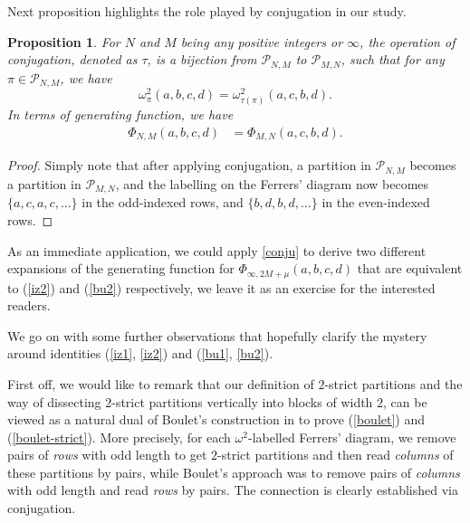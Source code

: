 \documentclass[12pt]{amsart}
\numberwithin{equation}{section}
\theoremstyle{plain}
\newtheorem{proposition}[theorem]{Proposition}
\theoremstyle{definition}
\begin{document}
Next proposition highlights the role played by conjugation in our study.
\begin{proposition}
For $N$ and $M$ being any positive integers or $\infty$, the operation of conjugation, denoted as $\tau$, is a bijection from $\mathcal{P}_{N,M}$ to $\mathcal{P}_{M,N}$, such that for any $\pi\in\mathcal{P}_{N,M}$, we have 
$$\omega^2_{\pi}(a,b,c,d)=\omega^2_{\tau(\pi)}(a,c,b,d).
$$
 In terms of generating function, we have
\begin{align}\label{conju}
\Phi_{N,M}(a,b,c,d) &=\Phi_{M,N}(a,c, b,d).
\end{align}
\end{proposition}
\begin{proof}
Simply note that after applying conjugation, a partition in $\mathcal{P}_{N,M}$ becomes a partition in $\mathcal{P}_{M,N}$, and the labelling on the Ferrers' diagram now becomes $\{a,c,a,c,\ldots\}$ in the odd-indexed rows, and $\{b,d,b,d,\ldots\}$ in the even-indexed rows.
\end{proof}
As an immediate application, we could apply \eqref{conju} to derive two different expansions of the generating function for $\Phi_{\infty, 2M+\mu}(a,b,c,d)$ that are equivalent to (\ref{iz2}) and (\ref{bu2}) respectively, we leave it as an exercise for the interested readers.

We go on with some further observations that hopefully clarify the mystery around identities (\ref{iz1}, \ref{iz2}) and (\ref{bu1}, \ref{bu2}).

First off, we would like to remark that our definition of $2$-strict partitions and the way of dissecting $2$-strict partitions vertically into blocks of width $2$, can be viewed as a natural dual of Boulet's construction in \cite{bou} to prove (\ref{boulet}) and (\ref{boulet-strict}). More precisely, for each $\omega^2$-labelled Ferrers' diagram, we remove pairs of {\it rows} with odd length to get $2$-strict partitions and then read {\it columns} of these partitions by pairs, while Boulet's approach was to remove pairs of {\it columns} with odd length and read {\it rows} by pairs. The connection is clearly established via conjugation. 
\end{document}
